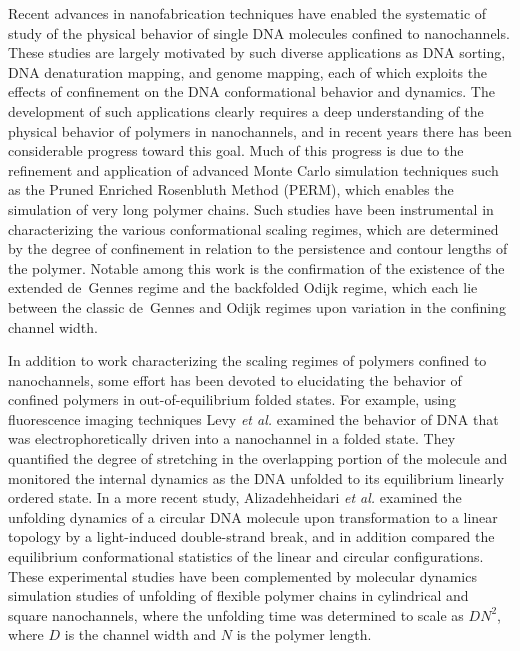 \documentclass[journal=mamobx,manuscript=article,layout=twocolumn]{achemso}
\begin{document}
Recent advances in nanofabrication techniques have enabled the systematic of study of the 
physical behavior of single DNA molecules confined to nanochannels.\cite{dai2016polymer,%
reisner2012dna} These studies are largely motivated by such diverse applications as DNA sorting,%
\cite{dorfman2012beyond} DNA denaturation mapping,\cite{reisner2010single,marie2013integrated} 
and genome mapping,\cite{lam2012genome,dorfman2013fluid} each of which exploits the effects of 
confinement on the DNA conformational behavior and dynamics.  The development of such 
applications clearly requires a deep understanding of the physical behavior of polymers 
in nanochannels, and in recent years there has been considerable progress toward this goal. 
Much of this progress is due to the refinement and application of advanced Monte Carlo simulation 
techniques such as the Pruned Enriched Rosenbluth Method (PERM), which enables the simulation 
of very long polymer chains.\cite{hsu2011review,tree2013dna} 
Such studies have been instrumental in characterizing the various 
conformational scaling regimes, which are determined by the degree of confinement in relation 
to the persistence and contour lengths of the polymer.\cite{odijk2008scaling,dai2016polymer} 
Notable among this work is the confirmation of the existence of the extended de~Gennes 
regime\cite{dai2014extended} and the backfolded Odijk regime,\cite{muralidhar2014backfolding} 
which each lie between the classic de~Gennes\cite{deGennes_book} and Odijk 
regimes\cite{odijk1983statistics} upon variation in the confining channel width.

In addition to work characterizing the scaling regimes of polymers confined to nanochannels, 
some effort has been devoted to elucidating the behavior of confined polymers in 
out-of-equilibrium folded states. For example, using fluorescence imaging techniques
Levy {\it et al.}\cite{levy2008entropic} examined the behavior of DNA that was electrophoretically 
driven into a nanochannel in a folded state. They quantified the degree of stretching in the 
overlapping portion of the molecule and monitored the internal dynamics as the
DNA unfolded to its equilibrium linearly ordered state. In a more recent study,
Alizadehheidari {\it et al.}\cite{alizadehheidari2015nanoconfined} examined the
unfolding dynamics of a circular DNA molecule upon transformation to a linear topology by a 
light-induced double-strand break, and in addition compared the equilibrium
conformational statistics of the linear and circular configurations. These experimental
studies have been complemented by molecular dynamics simulation studies of unfolding of 
flexible polymer chains in cylindrical\cite{ibanez2012entropic} and square\cite{ibanez2013hairpin}
nanochannels, where the unfolding time was determined to scale as $DN^2$, where
$D$ is the channel width and $N$ is the polymer length.
\end{document}
